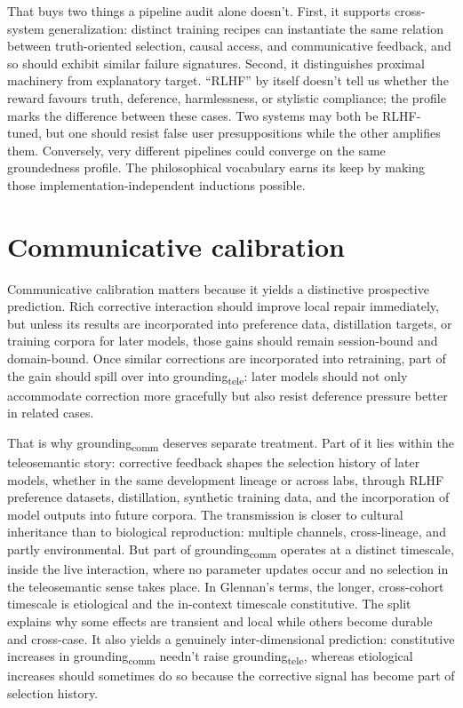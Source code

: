 \documentclass[12pt]{article}
\newcommand{\gtele}{grounding\textsubscript{tele}}
\newcommand{\gcomm}{grounding\textsubscript{comm}}
\begin{document}
That buys two things a pipeline audit alone doesn't. First, it supports cross-system generalization: distinct training recipes can instantiate the same relation between truth-oriented selection, causal access, and communicative feedback, and so should exhibit similar failure signatures. Second, it distinguishes proximal machinery from explanatory target. \enquote{RLHF} by itself doesn't tell us whether the reward favours truth, deference, harmlessness, or stylistic compliance; the profile marks the difference between these cases. Two systems may both be RLHF-tuned, but one should resist false user presuppositions while the other amplifies them. Conversely, very different pipelines could converge on the same groundedness profile. The philosophical vocabulary earns its keep by making those implementation-independent inductions possible.

\section{Communicative calibration}
\label{sec:calibration}

Communicative calibration matters because it yields a distinctive prospective prediction. Rich corrective interaction should improve local repair immediately, but unless its results are incorporated into preference data, distillation targets, or training corpora for later models, those gains should remain session-bound and domain-bound. Once similar corrections are incorporated into retraining, part of the gain should spill over into \gtele{}: later models should not only accommodate correction more gracefully but also resist deference pressure better in related cases.

That is why \gcomm{} deserves separate treatment. Part of it lies within the teleosemantic story: corrective feedback shapes the selection history of later models, whether in the same development lineage or across labs, through RLHF preference datasets, distillation, synthetic training data, and the incorporation of model outputs into future corpora. The transmission is closer to cultural inheritance than to biological reproduction: multiple channels, cross-lineage, and partly environmental. But part of \gcomm{} operates at a distinct timescale, inside the live interaction, where no parameter updates occur and no selection in the teleosemantic sense takes place. In Glennan's terms, the longer, cross-cohort timescale is etiological and the in-context timescale constitutive. The split explains why some effects are transient and local while others become durable and cross-case. It also yields a genuinely inter-dimensional prediction: constitutive increases in \gcomm{} needn't raise \gtele{}, whereas etiological increases should sometimes do so because the corrective signal has become part of selection history.
\end{document}
